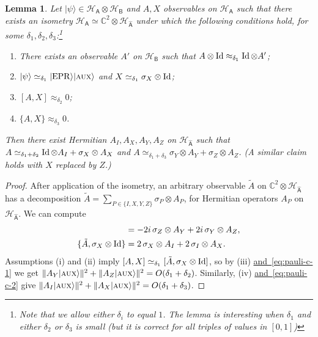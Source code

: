 \documentclass[11pt]{article}
\numberwithin{equation}{section}
\newtheorem{lemma}[theorem]{Lemma}
\theoremstyle{definition}
\theoremstyle{plain}
\newcommand{\C}{\mathbb C}
\newcommand{\expeqref}[2]{\hyperref[#2]{#1~\eqref{#2}}}
\newcommand{\ket}[1]{|#1\rangle}
\newcommand{\Id}{\ensuremath{\mathop{\rm Id}\nolimits}}
\newcommand{\reg}[1]{{\textsf{#1}}}
\newcommand{\mH}{\mathcal{H}}
\newcommand{\EPR}{{\rm EPR}}
\newcommand{\aux}{\textsc {aux}}
\begin{document}
\begin{lemma}\label{lem:pauli-c}
Let $\ket{\psi} \in \mH_{\reg{A}} \otimes \mH_{\reg{B}}$ and $A,X$ observables on $\mH_{\reg{A}}$ such that there exists an isometry $\mH_{\reg{A}} \simeq \C^2 \otimes \mH_{\hat{\reg{A}}}$ under which the following conditions hold, for some $\delta_1,\delta_2,\delta_3$:\footnote{Note that we allow either $\delta_i$ to equal $1$. The lemma is interesting when $\delta_1$ and \emph{either} $\delta_2$ \emph{or} $\delta_3$ is small (but it is correct for all triples of values in $[0,1]$)}
\begin{enumerate}
\item[(i)] There exists an observable $A'$ on $\mH_\reg{B}$ such that $A\otimes \Id \approx_{\delta_1} \Id \otimes A'$;
\item[(ii)] $\ket{\psi} \simeq_{\delta_1} \ket{\EPR}\ket{\aux}$ and $X\simeq_{\delta_1} \sigma_X \otimes \Id$; 
\item[(iii)] $[A,X]\approx_{\delta_2} 0$;
\item[(iv)] $\{A,X\} \approx_{\delta_3} 0$.
\end{enumerate}

Then there exist Hermitian $A_I,A_X,A_Y,A_Z$ on $\mH_{\hat{\reg{A}}}$ such that $A \simeq_{\delta_1+\delta_2} \Id \otimes A_I + \sigma_X \otimes A_X$ and $A \simeq_{\delta_1 + \delta_3} \sigma_Y \otimes A_Y + \sigma_Z \otimes A_Z$. (A similar claim holds with $X$ replaced by $Z$.)
\end{lemma}

\begin{proof}
After application of the isometry, an arbitrary observable $\tilde{A}$ on  $\C^2 \otimes \mH_{\hat{\reg{A}}}$ has a decomposition $\tilde{A} = \sum_{P\in\{I,X,Y,Z\}} \sigma_P \otimes A_P$, for Hermitian operators $A_P$ on $\mH_{\hat{\reg{A}}}$. We can compute
\begin{align}
[\tilde{A},\sigma_X\otimes \Id] &= -2i\,\sigma_Z \otimes A_Y + 2i\,\sigma_Y \otimes A_Z,\label{eq:pauli-c-1}\\
\{\tilde{A},\sigma_X\otimes \Id\} &= 2\,\sigma_X \otimes A_I + 2 \,\sigma_I \otimes A_X.\label{eq:pauli-c-2}
\end{align} 
Assumptions (i) and (ii) imply $[A,X] \simeq_{\delta_1} [\tilde{A},\sigma_X \otimes \Id]$, so by (iii) \expeqref{and}{eq:pauli-c-1} we get $\| A_Y \ket{\aux}\|^2 + \|A_Z \ket{\aux}\|^2 = O(\delta_1+\delta_2)$. Similarly, (iv) \expeqref{and}{eq:pauli-c-2} give $\| A_I \ket{\aux}\|^2 + \|A_X \ket{\aux}\|^2 = O(\delta_1+\delta_3)$.
\end{proof}
\end{document}
